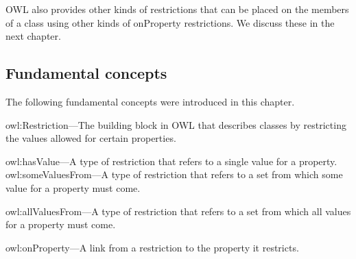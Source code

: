 OWL also provides other kinds of restrictions that can be placed on the
members of a class using other kinds of onProperty restrictions. We
discuss these in the next chapter.

\subsection{Fundamental concepts}

The following fundamental concepts were introduced in this chapter.

owl:Restriction---The building block in OWL that describes classes by
restricting the values allowed for certain properties.

owl:hasValue---A type of restriction that refers to a single value for a
property. owl:someValuesFrom---A type of restriction that refers to a
set from which some value for a property must come.

owl:allValuesFrom---A type of restriction that refers to a set from
which all values for a property must come.

owl:onProperty---A link from a restriction to the property it restricts.
